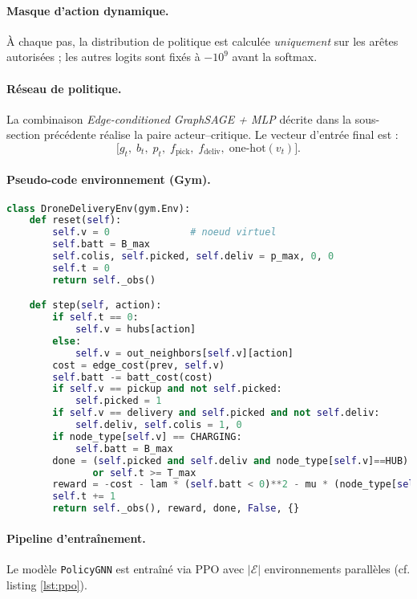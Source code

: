 \documentclass[11pt,a4paper]{article}
\begin{document}
\paragraph{Masque d'action dynamique.}
À chaque pas, la distribution de politique est calculée \emph{uniquement} sur les arêtes
autorisées ; les autres logits sont fixés à $-10^{9}$ avant la softmax.

\paragraph{Réseau de politique.}
La combinaison \emph{Edge-conditioned GraphSAGE + MLP} décrite dans
la sous-section précédente réalise la paire acteur–critique.  
Le vecteur d'entrée final est :
\[
\bigl[g_t,\;b_t,\;p_t,\;f_{\text{pick}},\;f_{\text{deliv}},\;\text{one-hot}(v_t)\bigr].
\]

\paragraph{Pseudo-code environnement (Gym).}
\vspace{-3pt}
\begin{lstlisting}[language=Python,basicstyle=\ttfamily\small,frame=single]
class DroneDeliveryEnv(gym.Env):
    def reset(self):
        self.v = 0              # noeud virtuel
        self.batt = B_max
        self.colis, self.picked, self.deliv = p_max, 0, 0
        self.t = 0
        return self._obs()

    def step(self, action):
        if self.t == 0:
            self.v = hubs[action]
        else:
            self.v = out_neighbors[self.v][action]
        cost = edge_cost(prev, self.v)
        self.batt -= batt_cost(cost)
        if self.v == pickup and not self.picked:
            self.picked = 1
        if self.v == delivery and self.picked and not self.deliv:
            self.deliv, self.colis = 1, 0
        if node_type[self.v] == CHARGING:
            self.batt = B_max
        done = (self.picked and self.deliv and node_type[self.v]==HUB) \
               or self.t >= T_max
        reward = -cost - lam * (self.batt < 0)**2 - mu * (node_type[self.v]==CHARGING)
        self.t += 1
        return self._obs(), reward, done, False, {}
\end{lstlisting}
\vspace{-6pt}

\paragraph{Pipeline d'entraînement.}
Le modèle \texttt{PolicyGNN} est entraîné via PPO
avec \(|\mathcal{E}|\) environnements parallèles (cf. listing \ref{lst:ppo}).
\end{document}
